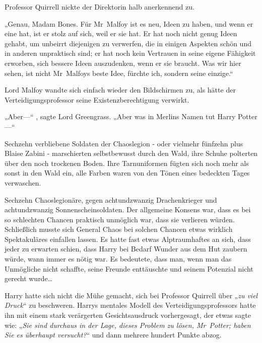{Professor Quirrell nickte der Direktorin halb anerkennend zu.

„Genau, Madam Bones. Für Mr~Malfoy ist es neu, Ideen zu haben, und wenn er eine hat, ist er stolz auf sich, weil er sie hat. Er hat noch nicht genug Ideen gehabt, um unbeirrt diejenigen zu verwerfen, die in einigen Aspekten schön und in anderen unpraktisch sind; er hat noch kein Vertrauen in seine eigene Fähigkeit erworben, sich bessere Ideen auszudenken, wenn er sie braucht. Was wir hier sehen, ist nicht Mr~Malfoys beste Idee, fürchte ich, sondern seine einzige.“

Lord Malfoy wandte sich einfach wieder den Bildschirmen zu, als hätte der Verteidigungsprofessor seine Existenzberechtigung verwirkt.

„Aber—“ , sagte Lord Greengrass. „Aber was in Merlins Namen tut Harry Potter—“

Sechzehn verbliebene Soldaten der Chaoslegion - oder vielmehr fünfzehn plus Blaise Zabini - marschierten selbstbewusst durch den Wald, ihre Schuhe polterten über den noch trockenen Boden. Ihre Tarnuniformen fügten sich noch mehr als sonst in den Wald ein, alle Farben waren von den Tönen eines bedeckten Tages verwaschen.

Sechzehn Chaoslegionäre, gegen achtundzwanzig Drachenkrieger und achtundzwanzig Sonnenscheinsoldaten. Der allgemeine Konsens war, dass es bei so schlechten Chancen praktisch unmöglich war, dass sie verlieren würden. Schließlich musste sich General Chaos bei solchen Chancen etwas wirklich Spektakuläres einfallen lassen. Es hatte fast etwas Alptraumhaftes an sich, dass jeder zu erwarten schien, dass Harry bei Bedarf Wunder aus dem Hut zaubern würde, wann immer es nötig war. Es bedeutete, dass man, wenn man das Unmögliche nicht schaffte, seine Freunde enttäuschte und seinem Potenzial nicht gerecht wurde…

Harry hatte sich nicht die Mühe gemacht, sich bei Professor Quirrell über „\emph{zu viel Druck}“ zu beschweren. Harrys mentales Modell des Verteidigungsprofessors hatte ihn mit einem stark verärgerten Gesichtsausdruck vorhergesagt, der etwas sagte wie: „\emph{Sie sind durchaus in der Lage, dieses Problem zu lösen, Mr~Potter; haben Sie es überhaupt versucht?}“ und dann mehrere hundert Punkte abzog.

}
